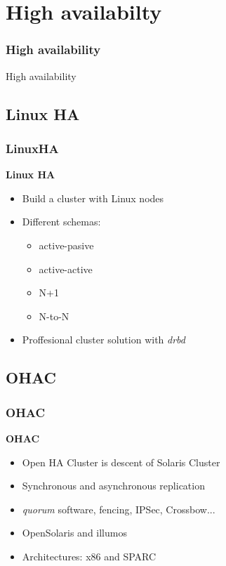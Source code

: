 \documentclass{beamer}
\begin{document}
\section{High availabilty}

\begin{frame}
  \frametitle{High availability}
  \begin{center}
    \Huge High availability
  \end{center}
\end{frame}

  \subsection{Linux HA}
  \begin{frame}
    \frametitle{LinuxHA}
    \textbf{Linux HA}
    \begin{itemize}
      \item Build a cluster with Linux nodes
      \item Different schemas:
        \begin{itemize}
          \item active-pasive
          \item active-active
          \item N+1
          \item N-to-N
        \end{itemize}
      \item Proffesional cluster solution with \textit{drbd}
    \end{itemize}
  \end{frame}
  
  \subsection{OHAC}
  \begin{frame}
    \frametitle{OHAC}
    \textbf{OHAC}
    \begin{itemize}
      \item Open HA Cluster is descent of Solaris Cluster
      \item Synchronous and asynchronous replication
      \item \textit{quorum} software, fencing, IPSec, Crossbow...
      \item OpenSolaris and illumos
      \item Architectures: x86 and SPARC
    \end{itemize}
  \end{frame}
\end{document}
